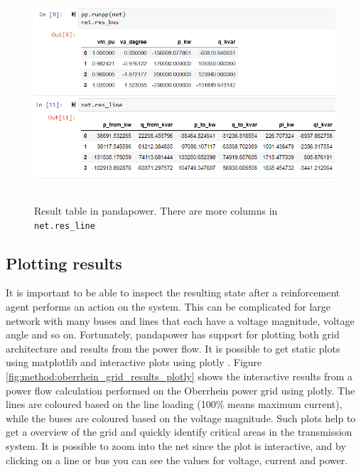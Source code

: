\documentclass[class=book, crop=false]{standalone}
\begin{document}
\begin{figure}[H]
    \includegraphics[height=8cm, width=14cm]{figures/case4g_line_bus_res.PNG}
    \caption[size = 9]{Result table in pandapower. There are more columns in \texttt{net.res\_line}}
    \label{fig:method:res_line_bus_dataframe}
\end{figure}

\subsection{Plotting results}
It is important to be able to inspect the resulting state after a reinforcement agent performs an action on the system. This can be complicated for large network with many buses and lines that each have a voltage magnitude, voltage angle and so on. Fortunately, pandapower has support for plotting both grid architecture and results from the power flow. It is possible to get static plots using matplotlib and interactive plots using plotly \cite{plotly}. Figure \ref{fig:method:oberrhein_grid_results_plotly} shows the interactive results from a power flow calculation performed on the Oberrhein power grid using plotly. The lines are coloured based on the line loading (100\% means maximum current), while the buses are coloured based on the voltage magnitude. Such plots help to get a overview of the grid and quickly identify critical areas in the transmission system. It is possible to zoom into the net since the plot is interactive, and by clicking on a line or bus you can see the values for voltage, current and power.
\end{document}
